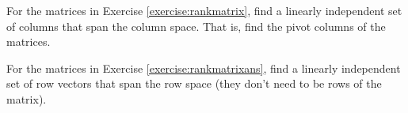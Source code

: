 \documentclass{ximera}
\begin{document}
\begin{exercise}
    For the matrices in Exercise \ref{exercise:rankmatrix}, find a linearly independent set of columns that span the column space. That is, find the pivot columns of the matrices.
\end{exercise}

\begin{exercise}%
    For the matrices in Exercise \ref{exercise:rankmatrixans}, find a linearly independent set of row vectors that span the row space (they don't need to be rows of the matrix).
\end{exercise}
\end{document}
